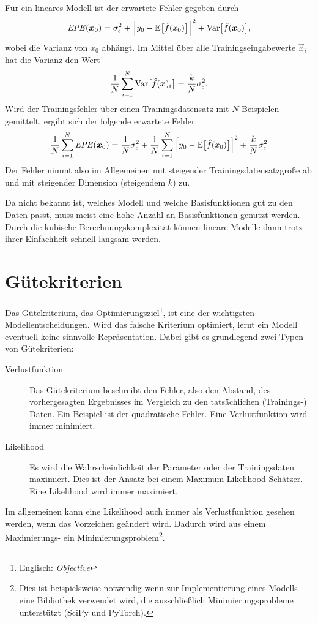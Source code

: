 			Für ein lineares Modell ist der erwartete Fehler gegeben durch
			\begin{equation}
				\mathit{EPE}(\bm{x}_0)
					= \sigma_\epsilon^2
					+ \Big[ y_0 - \mathbb{E}\big[ \hat{f}(x_0) \big] \Big]^2
					+ \operatorname{Var}\!\big[ \hat{f}(\bm{x}_0) \big],
			\end{equation}
			wobei die Varianz von \(x_0\) abhängt. Im Mittel über alle Trainingseingabewerte \( \vec{x}_i \) hat die Varianz den Wert
			\begin{equation}
				\frac{1}{N} \sum_{i = 1}^{N} \operatorname{Var}\!\big[ \hat{f}(\bm{x})_i \big] = \frac{k}{N} \sigma_\epsilon^2.
			\end{equation}
			Wird der Trainingsfehler über einen Trainingsdatensatz mit \(N\) Beispielen gemittelt, ergibt sich der folgende erwartete Fehler:
			\begin{equation}
				\frac{1}{N} \sum_{i = 1}^{N} \mathit{EPE}(\bm{x}_0)
					= \frac{1}{N} \sigma_\epsilon^2
					+ \frac{1}{N} \sum_{i = 1}^{N} \Big[ y_0 - \mathbb{E}\big[ \hat{f}(x_0) \big] \Big]^2
					+ \frac{k}{N} \sigma_\epsilon^2
			\end{equation}
			Der Fehler nimmt also im Allgemeinen mit steigender Trainingsdatensatzgröße ab und mit steigender Dimension (steigendem \(k\)) zu.

			Da nicht bekannt ist, welches Modell und welche Basisfunktionen gut zu den Daten passt, muss meist eine hohe Anzahl an Basisfunktionen genutzt werden. Durch die kubische Berechnungskomplexität können lineare Modelle dann trotz ihrer Einfachheit schnell langsam werden.

	\section{Gütekriterien}
		\label{sec:optCriteria}

		Das Gütekriterium, \bzw das Optimierungsziel\footnote{Englisch: \emph{Objective}}, ist eine der wichtigsten Modellentscheidungen. Wird das falsche Kriterium optimiert, lernt ein Modell eventuell keine sinnvolle Repräsentation. Dabei gibt es grundlegend zwei Typen von Gütekriterien:
		\begin{description}
			\item[Verlustfunktion] Das Gütekriterium beschreibt den Fehler, also den Abstand, des vorhergesagten Ergebnisses im Vergleich zu den tatsächlichen (Trainings-) Daten. Ein Beispiel ist der quadratische Fehler. Eine Verlustfunktion wird immer minimiert.
			\item[Likelihood] Es wird die Wahrscheinlichkeit der Parameter oder der Trainingsdaten maximiert. Dies ist \zB der Ansatz bei einem Maximum Likelihood-Schätzer. Eine Likelihood wird immer maximiert.
		\end{description}
		Im allgemeinen kann eine Likelihood auch immer als Verlustfunktion gesehen werden, wenn das Vorzeichen geändert wird. Dadurch wird aus einem Maximierungs- ein Minimierungsproblem\footnote{Dies ist beispielsweise notwendig wenn zur Implementierung eines Modells eine Bibliothek verwendet wird, die ausschließlich Minimierungsprobleme unterstützt (\zB SciPy und PyTorch).}.

